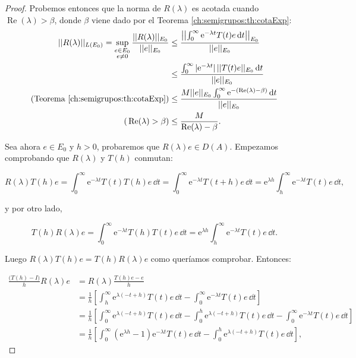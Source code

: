 \begin{proof}
    Probemos entonces que la norma de $R(\lambda)$ es acotada cuando $\operatorname{Re}(\lambda) > \beta$, donde $\beta$ viene dado por el Teorema \ref{ch:semigrupos:th:cotaExp}:
    \begin{align*}
        ||R(\lambda)||_{L(E_0)} = \sup_{\substack{e \in E_0 \\ e \neq 0}} \frac{||R(\lambda)||_{E_0}}{||e||_{E_0}} &\leq \frac{\left | \left | \int_0^{\infty}\mathrm{e}^{-\lambda t}T(t)e \, \mathrm{d} t \right | \right |_{E_0}}{||e||_{E_0}}\\
        &\leq \frac{\int_0^{\infty}|\mathrm{e}^{-\lambda t}| \, ||T(t)e||_{E_0} \, \mathrm{d} t}{||e||_{E_0}}\\
        \text{(Teorema \ref{ch:semigrupos:th:cotaExp})}&\leq \frac{M ||e||_{E_0} \int_0^\infty \mathrm{e}^{-(\operatorname{Re}(\lambda) - \beta)} \, \mathrm{d} t}{||e||_{E_0}}\\
        \text{(}\operatorname{Re}(\lambda) > \beta\text{)}&\leq \frac{M}{\operatorname{Re}(\lambda) - \beta}.
    \end{align*}

    Sea ahora $e \in E_0$ y $h>0$, probaremos que $R(\lambda)e \in D(A)$. Empezamos comprobando que $R(\lambda)$ y $T(h)$ conmutan:

    \[R(\lambda)T(h)e = \int_0^\infty\mathrm{e}^{-\lambda t}T(t)T(h)e \, \dd t = \int_0^\infty\mathrm{e}^{-\lambda t}T(t + h)e \, \dd t = \mathrm{e}^{\lambda h} \int_h^\infty \mathrm{e}^{-\lambda t} T(t)e \, \dd t,\]

    y por otro lado,

    \[T(h)R(\lambda)e = \int_0^\infty \mathrm{e}^{-\lambda t}T(h)T(t)e \, \dd t = \mathrm{e}^{\lambda h} \int_h^\infty \mathrm{e}^{-\lambda t} T(t)e \, \dd t.\]

    Luego $R(\lambda)T(h)e = T(h)R(\lambda)e$ como queríamos comprobar. Entonces:

    \begin{align*}
        \frac{\big(T(h) - I\big)}{h}R(\lambda)e &= R(\lambda)\frac{T(h)e - e}{h}\\
        &=\frac{1}{h}\left [\int_h^\infty \mathrm{e}^{\lambda(-t + h)}T(t)e \, \dd t - \int_0^\infty\mathrm{e}^{-\lambda t}T(t)e \, \dd t \right ]\\
        &=\frac{1}{h}\left [\int_0^\infty \mathrm{e}^{\lambda(-t + h)}T(t)e \, \dd t - \int_0^h \mathrm{e}^{\lambda(-t + h)}T(t)e \, \dd t - \int_0^\infty\mathrm{e}^{-\lambda t}T(t)e \, \dd t \right ]\\
        &=\frac{1}{h}\left[\int_0^\infty (\mathrm{e}^{\lambda h} - 1) \mathrm{e}^{-\lambda t}T(t)e \, \dd t - \int_0^h\mathrm{e}^{\lambda(-t + h)}T(t)e \, \dd t\right],
    \end{align*}


\end{proof}
